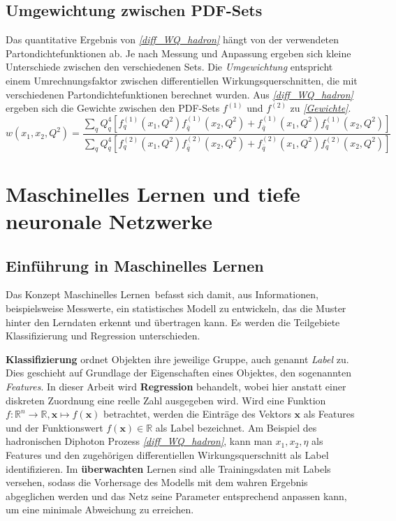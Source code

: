 \section{Umgewichtung zwischen PDF-Sets}
Das quantitative Ergebnis von \textit{\autoref{diff_WQ_hadron}} hängt von der verwendeten Partondichtefunktionen ab. Je nach Messung und Anpassung ergeben sich kleine Unterschiede zwischen den verschiedenen Sets. Die \textit{Umgewichtung} entspricht einem Umrechnungsfaktor zwischen differentiellen Wirkungsquerschnitten, die mit verschiedenen Partondichtefunktionen berechnet wurden. Aus \textit{\autoref{diff_WQ_hadron}}  ergeben sich die Gewichte zwischen den PDF-Sets $f^{(1)}$ und $f^{(2)}$ zu \textit{\autoref{Gewichte}}.
\begin{equation}
w\left(x_1, x_2, Q^2\right) = \frac{ \sum_{q} Q_q^4 \left[f_q^{(1)}(x_1, Q^2)f_{\overline{q}}^{(1)}(x_2, Q^2) +f_{\overline{q}}^{(1)}(x_1, Q^2)f_{q}^{(1)}(x_2, Q^2) \right]}{\sum_{q} Q_q^4 \left[f_q^{(2)}(x_1, Q^2)f_{\overline{q}}^{(2)}(x_2, Q^2) +f_{\overline{q}}^{(2)}(x_1, Q^2)f_{q}^{(2)}(x_2, Q^2) \right]}
\label{Gewichte}
\end{equation}
\chapter{Maschinelles Lernen und tiefe neuronale Netzwerke}
\label{3}
\section{Einführung in Maschinelles Lernen}
Das Konzept \glqq Maschinelles Lernen\grqq~befasst sich damit, aus Informationen, beispielsweise Messwerte, ein statistisches Modell zu entwickeln, das die Muster hinter den Lerndaten erkennt und übertragen kann. Es werden die Teilgebiete Klassifizierung und Regression unterschieden.

\textbf{Klassifizierung} ordnet Objekten ihre jeweilige Gruppe, auch genannt \textit{Label} zu. Dies geschieht auf Grundlage der Eigenschaften eines Objektes, den sogenannten \textit{Features}.
In dieser Arbeit wird \textbf{Regression} behandelt, wobei hier anstatt einer diskreten Zuordnung eine reelle Zahl ausgegeben wird. Wird eine Funktion $f: \mathbb{R}^n \rightarrow \mathbb{R}, \mathbf{x} \mapsto f(\mathbf{x})$ betrachtet, werden die Einträge des Vektors $\mathbf{x}$ als Features und der Funktionswert $f(\mathbf{x}) \in \mathbb{R}$ als Label bezeichnet. Am Beispiel des hadronischen Diphoton Prozess \textit{\autoref{diff_WQ_hadron}}, kann man $x_1, x_2, \eta$ als Features und den zugehörigen differentiellen Wirkungsquerschnitt als Label identifizieren. 
Im \textbf{überwachten} Lernen sind alle Trainingsdaten mit Labels versehen, sodass die Vorhersage des Modells mit dem wahren Ergebnis abgeglichen werden und das Netz seine Parameter entsprechend anpassen kann, um eine minimale Abweichung zu erreichen. 

